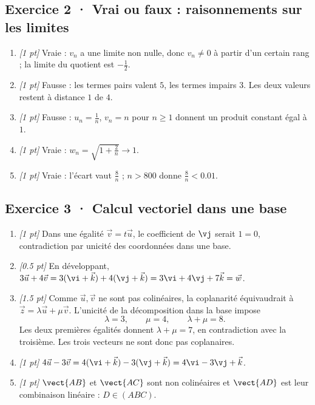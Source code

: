 \subsection*{Exercice 2 · Vrai ou faux : raisonnements sur les limites}\begin{enumerate}

\item \textit{[1 pt]} Vraie : $v_n$ a une limite non nulle, donc $v_n\ne0$ à partir d'un certain rang ; la limite du quotient est $-\frac{1}{2}$.

\item \textit{[1 pt]} Fausse : les termes pairs valent $5$, les termes impairs $3$. Les deux valeurs restent à distance $1$ de $4$.

\item \textit{[1 pt]} Fausse : $u_n=\frac{1}{n}$, $v_n=n$ pour $n\ge1$ donnent un produit constant égal à $1$.

\item \textit{[1 pt]} Vraie : $w_n=\sqrt{1+\frac{2}{n}}\to1$.

\item \textit{[1 pt]} Vraie : l'écart vaut $\frac{8}{n}$ ; $n>800$ donne $\frac{8}{n}<\num{0,01}$.

\end{enumerate}

\subsection*{Exercice 3 · Calcul vectoriel dans une base}\begin{enumerate}

\item \textit{[1 pt]} Dans une égalité $\vec v=t\vec u$, le coefficient de $\vj $ serait $1=0$, contradiction par unicité des coordonnées dans une base.

\item \textit{[\num{0,5} pt]} En développant, $3\vec u+4\vec v=3(\vi +\vec k)+4(\vj +\vec k)=3\vi +4\vj +7\vec k=\vec w$.

\item \textit{[\num{1,5} pt]} Comme $\vec u,\vec v$ ne sont pas colinéaires, la coplanarité équivaudrait à $\vec z=\lambda\vec u+\mu\vec v$. L'unicité de la décomposition dans la base impose
\[\lambda=3,\qquad\mu=4,\qquad\lambda+\mu=8.\]
Les deux premières égalités donnent $\lambda+\mu=7$, en contradiction avec la troisième. Les trois vecteurs ne sont donc pas coplanaires.

\item \textit{[1 pt]} $4\vec u-3\vec v=4(\vi +\vec k)-3(\vj +\vec k)=4\vi -3\vj +\vec k$.

\item \textit{[1 pt]} $\vect{AB}$ et $\vect{AC}$ sont non colinéaires et $\vect{AD}$ est leur combinaison linéaire : $D\in(ABC)$.

\end{enumerate}

